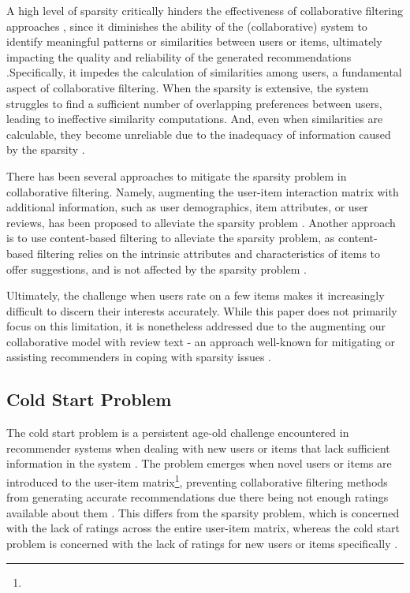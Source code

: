 A high level of sparsity critically hinders the effectiveness of collaborative filtering approaches \cite{da2018effects}, since it diminishes the ability of the (collaborative) system to identify meaningful patterns or similarities between users or items, ultimately impacting the quality and reliability of the generated recommendations \cite{burke2015robust}.Specifically, it impedes the calculation of similarities among users, a fundamental aspect of collaborative filtering. When the sparsity is extensive, the system struggles to find a sufficient number of overlapping preferences between users, leading to ineffective similarity computations. And, even when similarities are calculable, they become unreliable due to the inadequacy of information caused by the sparsity \cite{da2018effects}.

There has been several approaches to mitigate the sparsity problem in collaborative filtering. Namely, augmenting the user-item interaction matrix with additional information, such as user demographics, item attributes, or user reviews, has been proposed to alleviate the sparsity problem \cite{srifi2020recommender}. Another approach is to use content-based filtering to alleviate the sparsity problem, as content-based filtering relies on the intrinsic attributes and characteristics of items to offer suggestions, and is not affected by the sparsity problem \cite{lops2011content}.

Ultimately, the challenge when users rate on a few items makes it increasingly difficult to discern their interests accurately. While this paper does not primarily focus on this limitation, it is nonetheless addressed due to the augmenting our collaborative model with review text - an approach well-known for mitigating or assisting recommenders in coping with sparsity issues \cite{srifi2020recommender}.


\subsection{Cold Start Problem}
\label{subsec:2 Cold Start Problem}

The cold start problem is a persistent age-old challenge encountered in recommender systems when dealing with new users or items that lack sufficient information in the system \cite{lika2014facing}. The problem emerges when novel users or items are introduced to the user-item matrix\footnote{}, preventing collaborative filtering methods from generating accurate recommendations due there being not enough ratings available about them \cite{huang2004applying}. This differs from the sparsity problem, which is concerned with the lack of ratings across the entire user-item matrix, whereas the cold start problem is concerned with the lack of ratings for new users or items specifically \cite{lika2014facing}. 

